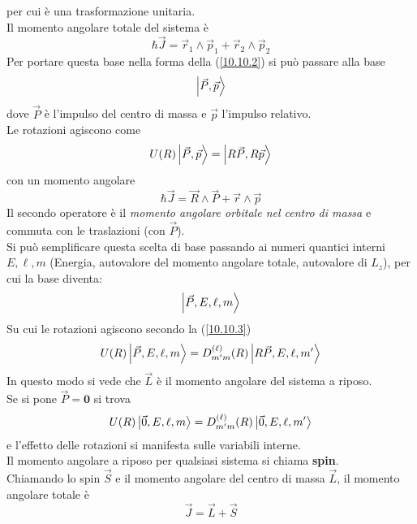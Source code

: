 \documentclass[twoside]{article}
\renewcommand{\vec}[1]{\textbf{#1}}
\begin{document}
per cui è una trasformazione unitaria.
\\
Il momento angolare totale del sistema è
\begin{equation}
    \hbar\Vec{J}=\Vec{r}_1 \wedge \Vec{p}_1 + \Vec{r}_2 \wedge \Vec{p}_2
\end{equation}
Per portare questa base nella forma della (\ref{10.10.2}) si può passare alla base
\begin{equation}
    \ket{\Vec{P},\Vec{p}}
\end{equation}
dove $\Vec{P}$ è l'impulso del centro di massa e $\Vec{p}$ l'impulso relativo.
\\
Le rotazioni agiscono come
\begin{equation}
    U(R)\ket{\Vec{P},\Vec{p}}=\ket{R\Vec{P},R\Vec{p}}
\end{equation}
con un momento angolare
\begin{equation}
    \hbar\Vec{J}=\Vec{R}\wedge\Vec{P}+\Vec{r}\wedge\Vec{p}
\end{equation}
Il secondo operatore è il \textit{momento angolare orbitale nel centro di massa} e commuta con le traslazioni (con $\Vec{P}$).
\\
Si può semplificare questa scelta di base passando ai numeri quantici interni $E,\ell,m$ (Energia, autovalore del momento angolare totale, autovalore di $L_z$), per cui la base diventa:
\begin{equation}
    \ket{\Vec{P},E,\ell,m}
\end{equation}
Su cui le rotazioni agiscono secondo la (\ref{10.10.3})
\begin{equation}
    U(R)\ket{\Vec{P},E,\ell,m}=D_{m'm}^{(\ell)}(R)\ket{R\Vec{P},E,\ell,m'}
\end{equation}
In questo modo si vede che $\Vec{L}$ è il momento angolare del sistema a riposo.
\\
Se si pone $\Vec{P}=\vec{0}$ si trova
\begin{equation}
    U(R)\ket{\Vec{0},E,\ell,m}=D_{m'm}^{(\ell)}(R)\ket{\Vec{0},E,\ell,m'}
\end{equation}
e l'effetto delle rotazioni si manifesta sulle variabili interne.
\\
Il momento angolare a riposo per qualsiasi sistema si chiama \textbf{spin}.
\\
Chiamando lo spin $\Vec{S}$ e il momento angolare del centro di massa $\Vec{L}$, il momento angolare totale è
\begin{equation}\label{J}
    \Vec{J}=\Vec{L}+\Vec{S}
\end{equation}
\end{document}
